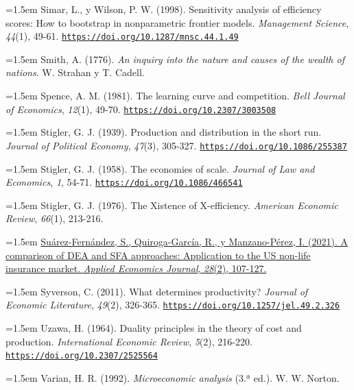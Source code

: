 \documentclass[10pt,a4paper]{article}
\begin{document}
\noindent\hangindent=1.5em Simar, L., y Wilson, P. W. (1998). Sensitivity analysis of efficiency scores: How to bootstrap in nonparametric frontier models. \textit{Management Science}, \textit{44}(1), 49-61. \href{https://doi.org/10.1287/mnsc.44.1.49}{\nolinkurl{https://doi.org/10.1287/mnsc.44.1.49}}

\noindent\hangindent=1.5em Smith, A. (1776). \textit{An inquiry into the nature and causes of the wealth of nations}. W. Strahan y T. Cadell.

\noindent\hangindent=1.5em Spence, A. M. (1981). The learning curve and competition. \textit{Bell Journal of Economics}, \textit{12}(1), 49-70. \href{https://doi.org/10.2307/3003508}{\nolinkurl{https://doi.org/10.2307/3003508}}

\noindent\hangindent=1.5em Stigler, G. J. (1939). Production and distribution in the short run. \textit{Journal of Political Economy}, \textit{47}(3), 305-327. \href{https://doi.org/10.1086/255387}{\nolinkurl{https://doi.org/10.1086/255387}}

\noindent\hangindent=1.5em Stigler, G. J. (1958). The economies of scale. \textit{Journal of Law and Economics}, \textit{1}, 54-71. \href{https://doi.org/10.1086/466541}{\nolinkurl{https://doi.org/10.1086/466541}}

\noindent\hangindent=1.5em Stigler, G. J. (1976). The Xistence of X-efficiency. \textit{American Economic Review}, \textit{66}(1), 213-216.

\noindent\hangindent=1.5em \href{https://so01.tci-thaijo.org/index.php/AEJ/article/view/242756}{Suárez-Fernández, S., Quiroga-García, R., y Manzano-Pérez, I. (2021). A comparison of DEA and SFA approaches: Application to the US non-life insurance market. \textit{Applied Economics Journal}, \textit{28}(2), 107-127.}

\noindent\hangindent=1.5em Syverson, C. (2011). What determines productivity? \textit{Journal of Economic Literature}, \textit{49}(2), 326-365. \href{https://doi.org/10.1257/jel.49.2.326}{\nolinkurl{https://doi.org/10.1257/jel.49.2.326}}

\noindent\hangindent=1.5em Uzawa, H. (1964). Duality principles in the theory of cost and production. \textit{International Economic Review}, \textit{5}(2), 216-220. \href{https://doi.org/10.2307/2525564}{\nolinkurl{https://doi.org/10.2307/2525564}}

\noindent\hangindent=1.5em Varian, H. R. (1992). \textit{Microeconomic analysis} (3.ª ed.). W. W. Norton.
\end{document}
